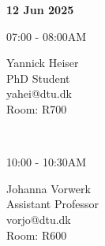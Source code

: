 \documentclass[10pt]{extarticle}
\begin{document}
\begin{center}
\begin{minipage}[t]{0.75\columnwidth}
        \hspace{0.0cm}
            \begin{minipage}[t]{0.3333333333333333\columnwidth}
                \begin{flushleft}
                    \textbf{12 Jun 2025} \\
                \end{flushleft}
            \begin{minipage}[t]{0.3\columnwidth}
                07:00 - 08:00AM
            \end{minipage}%
            \begin{minipage}[t]{0.65\columnwidth}
                Yannick Heiser \\
                PhD Student \\
                yahei@dtu.dk \\
                Room: R700 \\
            \end{minipage}
            \vspace{0.01cm} \\
            \begin{minipage}[t]{0.3\columnwidth}
                10:00 - 10:30AM
            \end{minipage}%
            \begin{minipage}[t]{0.65\columnwidth}
                Johanna Vorwerk \\
                Assistant Professor \\
                vorjo@dtu.dk \\
                Room: R600 \\
            \end{minipage}
            \vspace{0.01cm} \\
            \end{minipage}%
            \vspace{0.01cm}
        \end{minipage}
    \end{center}
\end{document}
